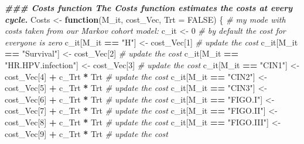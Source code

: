 \documentclass[
]{article}
\newenvironment{Shaded}{\begin{snugshade}}{\end{snugshade}}
\newcommand{\AttributeTok}[1]{\textcolor[rgb]{0.13,0.29,0.53}{#1}}
\newcommand{\CommentTok}[1]{\textcolor[rgb]{0.56,0.35,0.01}{\textit{#1}}}
\newcommand{\ConstantTok}[1]{\textcolor[rgb]{0.56,0.35,0.01}{#1}}
\newcommand{\ControlFlowTok}[1]{\textcolor[rgb]{0.13,0.29,0.53}{\textbf{#1}}}
\newcommand{\DecValTok}[1]{\textcolor[rgb]{0.00,0.00,0.81}{#1}}
\newcommand{\DocumentationTok}[1]{\textcolor[rgb]{0.56,0.35,0.01}{\textbf{\textit{#1}}}}
\newcommand{\NormalTok}[1]{#1}
\newcommand{\OtherTok}[1]{\textcolor[rgb]{0.56,0.35,0.01}{#1}}
\newcommand{\SpecialCharTok}[1]{\textcolor[rgb]{0.81,0.36,0.00}{\textbf{#1}}}
\newcommand{\StringTok}[1]{\textcolor[rgb]{0.31,0.60,0.02}{#1}}
\begin{document}
\begin{Shaded}
\begin{Highlighting}[]
\DocumentationTok{\#\#\# Costs function The Costs function estimates the costs at every cycle.}
\NormalTok{Costs }\OtherTok{\textless{}{-}} \ControlFlowTok{function}\NormalTok{(M\_it, cost\_Vec, }\AttributeTok{Trt =} \ConstantTok{FALSE}\NormalTok{) \{}
    \CommentTok{\# my mode with costs taken from our Markov cohort model:}
\NormalTok{    c\_it }\OtherTok{\textless{}{-}} \DecValTok{0}  \CommentTok{\# by default the cost for everyone is zero}
\NormalTok{    c\_it[M\_it }\SpecialCharTok{==} \StringTok{"H"}\NormalTok{] }\OtherTok{\textless{}{-}}\NormalTok{ cost\_Vec[}\DecValTok{1}\NormalTok{]  }\CommentTok{\# update the cost }
\NormalTok{    c\_it[M\_it }\SpecialCharTok{==} \StringTok{"Survival"}\NormalTok{] }\OtherTok{\textless{}{-}}\NormalTok{ cost\_Vec[}\DecValTok{2}\NormalTok{]  }\CommentTok{\# update the cost }
\NormalTok{    c\_it[M\_it }\SpecialCharTok{==} \StringTok{"HR.HPV.infection"}\NormalTok{] }\OtherTok{\textless{}{-}}\NormalTok{ cost\_Vec[}\DecValTok{3}\NormalTok{]  }\CommentTok{\# update the cost }
\NormalTok{    c\_it[M\_it }\SpecialCharTok{==} \StringTok{"CIN1"}\NormalTok{] }\OtherTok{\textless{}{-}}\NormalTok{ cost\_Vec[}\DecValTok{4}\NormalTok{] }\SpecialCharTok{+}\NormalTok{ c\_Trt }\SpecialCharTok{*}\NormalTok{ Trt  }\CommentTok{\# update the cost }
\NormalTok{    c\_it[M\_it }\SpecialCharTok{==} \StringTok{"CIN2"}\NormalTok{] }\OtherTok{\textless{}{-}}\NormalTok{ cost\_Vec[}\DecValTok{5}\NormalTok{] }\SpecialCharTok{+}\NormalTok{ c\_Trt }\SpecialCharTok{*}\NormalTok{ Trt  }\CommentTok{\# update the cost }
\NormalTok{    c\_it[M\_it }\SpecialCharTok{==} \StringTok{"CIN3"}\NormalTok{] }\OtherTok{\textless{}{-}}\NormalTok{ cost\_Vec[}\DecValTok{6}\NormalTok{] }\SpecialCharTok{+}\NormalTok{ c\_Trt }\SpecialCharTok{*}\NormalTok{ Trt  }\CommentTok{\# update the cost }
\NormalTok{    c\_it[M\_it }\SpecialCharTok{==} \StringTok{"FIGO.I"}\NormalTok{] }\OtherTok{\textless{}{-}}\NormalTok{ cost\_Vec[}\DecValTok{7}\NormalTok{] }\SpecialCharTok{+}\NormalTok{ c\_Trt }\SpecialCharTok{*}\NormalTok{ Trt  }\CommentTok{\# update the cost }
\NormalTok{    c\_it[M\_it }\SpecialCharTok{==} \StringTok{"FIGO.II"}\NormalTok{] }\OtherTok{\textless{}{-}}\NormalTok{ cost\_Vec[}\DecValTok{8}\NormalTok{] }\SpecialCharTok{+}\NormalTok{ c\_Trt }\SpecialCharTok{*}\NormalTok{ Trt  }\CommentTok{\# update the cost }
\NormalTok{    c\_it[M\_it }\SpecialCharTok{==} \StringTok{"FIGO.III"}\NormalTok{] }\OtherTok{\textless{}{-}}\NormalTok{ cost\_Vec[}\DecValTok{9}\NormalTok{] }\SpecialCharTok{+}\NormalTok{ c\_Trt }\SpecialCharTok{*}\NormalTok{ Trt  }\CommentTok{\# update the cost }

\end{Highlighting}
\end{Shaded}
\end{document}
